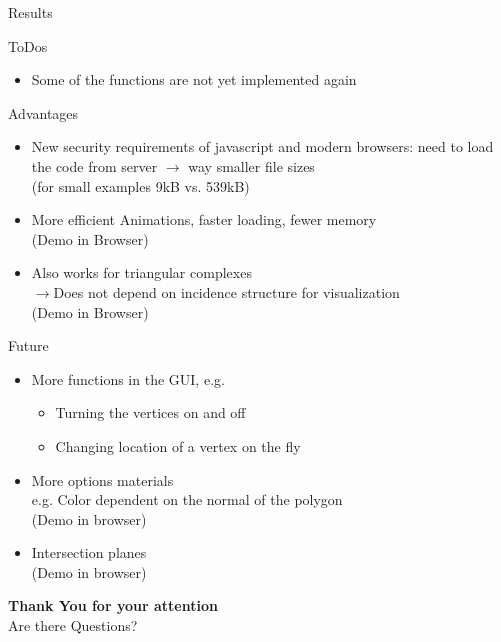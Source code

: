 \documentclass{beamer}
\numberwithin{equation}{aufgabe}
\begin{document}
\begin{frame}{Results}
    \begin{block}{ToDos}
        \begin{itemize}[label=-]
            \item Some of the functions are not yet implemented again
        \end{itemize}
    \end{block}
\pause
    \begin{exampleblock}{Advantages}
        \begin{itemize}[label=-]
            \item New security requirements of javascript and modern browsers: need to load the code from server $\xrightarrow{}$ way smaller file sizes\\
                (for small examples 9kB vs. 539kB)
                \pause
            \item More efficient Animations, faster loading, fewer memory\\
                (Demo in Browser)
                \pause
            \item Also works for triangular complexes\\
            $\xrightarrow{}$Does not depend on incidence structure for visualization\\
            (Demo in Browser)
        \end{itemize}
    \end{exampleblock}
\end{frame}
\begin{frame}
    \begin{block}{Future}
        \begin{itemize}[label=-]
            \item More functions in the GUI, e.g. \\
            \begin{itemize}[label=-]
                \item Turning the vertices on and off
                \item Changing location of a vertex on the fly
            \end{itemize}
            \item More options materials\\
                e.g. Color dependent on the normal of the polygon\\
                (Demo in browser)
            \item Intersection planes \\
                (Demo in browser)    
        \end{itemize}
    \end{block}
\end{frame}

\begin{frame}
    \textbf{\Large Thank You for your attention}\\
    \bigskip
    Are there Questions?
    \bigskip
    
    \printbibliography
\end{frame}
\end{document}
